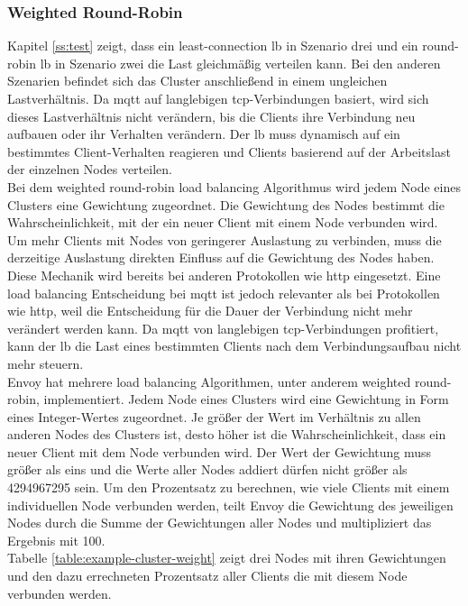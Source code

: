 \subsubsection{Weighted Round-Robin} \label{ss:weighted-rr}
Kapitel \ref{ss:test} zeigt, dass ein least-connection \acl{lb} in Szenario drei und ein round-robin \ac{lb} in Szenario zwei die Last gleichmä{\ss}ig verteilen kann.
Bei den anderen Szenarien befindet sich das Cluster anschlie{\ss}end in einem ungleichen Lastverhältnis.
Da \ac{mqtt} auf langlebigen \ac{tcp}-Verbindungen basiert, wird sich dieses Lastverhältnis nicht verändern, bis die Clients ihre Verbindung neu aufbauen oder ihr Verhalten verändern.
Der \ac{lb} muss dynamisch auf ein bestimmtes Client-Verhalten reagieren und Clients basierend auf der Arbeitslast der einzelnen Nodes verteilen.
\\
Bei dem weighted round-robin load balancing Algorithmus wird jedem Node eines Clusters eine Gewichtung zugeordnet. Die Gewichtung des Nodes bestimmt die Wahrscheinlichkeit, mit der ein neuer Client mit einem Node verbunden wird.
Um mehr Clients mit Nodes von geringerer Auslastung zu verbinden, muss die derzeitige Auslastung direkten Einfluss auf die Gewichtung des Nodes haben.
Diese Mechanik wird bereits bei anderen Protokollen wie \ac{http} eingesetzt.
Eine load balancing Entscheidung bei \ac{mqtt} ist jedoch relevanter als bei Protokollen wie \ac{http}, weil die Entscheidung für die Dauer der Verbindung nicht mehr verändert werden kann. Da \ac{mqtt} von langlebigen \ac{tcp}-Verbindungen profitiert, kann der \ac{lb} die Last eines bestimmten Clients nach dem Verbindungsaufbau nicht mehr steuern.
\\
Envoy hat mehrere load balancing Algorithmen, unter anderem weighted round-robin, implementiert.
Jedem Node eines Clusters wird eine Gewichtung in Form eines Integer-Wertes zugeordnet.
Je grö{\ss}er der Wert im Verhältnis zu allen anderen Nodes des Clusters ist, desto höher ist die Wahrscheinlichkeit, dass ein neuer Client mit dem Node verbunden wird. Der Wert der Gewichtung muss grö{\ss}er als eins und die Werte aller Nodes addiert dürfen nicht grö{\ss}er als 4294967295 sein.
Um den Prozentsatz zu berechnen, wie viele Clients mit einem individuellen Node verbunden werden, teilt Envoy die Gewichtung des jeweiligen Nodes durch die Summe der Gewichtungen aller Nodes und multipliziert das Ergebnis mit 100.
\cite{SupportedLoadBalancers}
\\
Tabelle \ref{table:example-cluster-weight} zeigt drei Nodes mit ihren Gewichtungen und den dazu errechneten Prozentsatz aller Clients die mit diesem Node verbunden werden.
